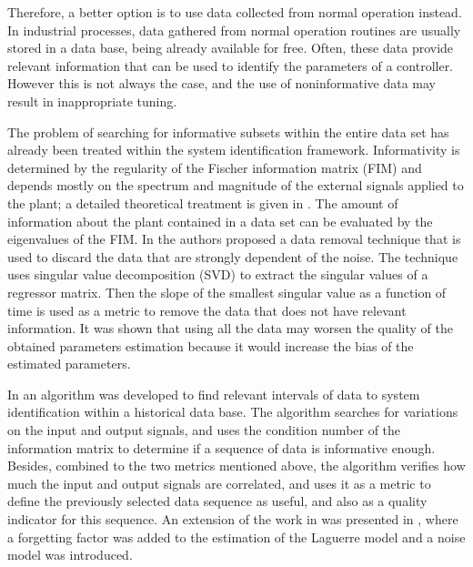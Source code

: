 \documentclass[letterpaper, 10 pt, conference]{ieeeconf}  %
\begin{document}
Therefore, a better option is to use data collected from normal operation instead. In industrial processes, data gathered from normal operation routines are usually stored in a data base, being already available for free. Often, these data provide relevant information that can be used to identify the parameters of a controller. However this is not always the case, and the use of noninformative data may result in inappropriate tuning.

The problem of searching for informative subsets within the entire data set has already been treated within the system identification framework.
Informativity is determined by the regularity of the Fischer information matrix (FIM) and depends mostly on the spectrum and magnitude of the external signals applied to the plant; a detailed theoretical treatment is given in \cite{bazanella2009}. The amount of information about the plant contained in a data set can be evaluated by the eigenvalues of the FIM.  In \cite{carrette1996discarding} the authors proposed a data removal technique that is used to discard the data that are strongly dependent of the noise.
The technique uses singular value decomposition (SVD) to extract the singular values of a regressor matrix.
Then the slope of the smallest singular value as a function of time is used as a metric to remove the data that does not have relevant information.
It was shown that using all the data may worsen the quality of the obtained parameters estimation because it would increase the bias of the estimated parameters.

In \cite{peretzki2011data} an algorithm was developed to find relevant intervals of data to system identification within a historical data base.
The algorithm searches for variations on the input and output signals, and uses the condition number of the information matrix to determine if a sequence of data is informative enough.
Besides, combined to the two metrics mentioned above, the algorithm verifies how much the input and output signals are correlated, and uses it as a metric to define the previously selected data sequence as useful, and also as a quality indicator for this sequence.
An extension of the work in \cite{peretzki2011data} was presented in \cite{bittencourt2015algorithm}, where a forgetting factor was added to the estimation of the Laguerre model and a noise model was introduced.
\end{document}
